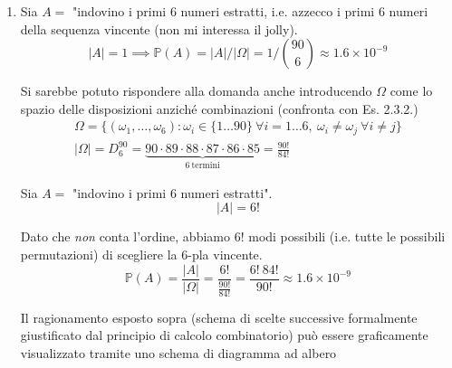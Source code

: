 \begin{enumerate}
\item Sia $A=$ "indovino i primi $6$ numeri estratti, i.e. azzecco i primi $6$ numeri della sequenza vincente (non mi interessa il jolly).\begin{equation*}
| A| =1\implies \mathbb{P}( A) =| A| /| \Omega | =1/\binom{90}{6} \approx 1.6\times 10^{-9}
\end{equation*}

\begin{oss}
Si sarebbe potuto rispondere alla domanda anche introducendo $\Omega $ come lo spazio delle disposizioni anziché combinazioni (confronta con Es. 2.3.2.)\begin{gather*}
\Omega =\{( \omega _{1} ,\dots ,\omega _{6}) :\omega _{i} \in \{1\dots 90\} \ \forall i=1\dots 6,\ \omega _{i} \neq \omega _{j} \ \forall i\neq j\}\\
| \Omega | =D_{6}^{90} =\underbrace{90\cdot 89\cdot 88\cdot 87\cdot 86\cdot 85}_{6\ \text{termini}} =\frac{90!}{84!}
\end{gather*}
\end{oss}

Sia $A=$ "indovino i primi $6$ numeri estratti".\begin{equation*}
| A| =6!
\end{equation*}

Dato che \textit{non} conta l'ordine, abbiamo $6!$ modi possibili (i.e. tutte le possibili permutazioni) di scegliere la $6$-pla vincente.\begin{equation*}
\mathbb{P}( A) =\frac{| A| }{| \Omega | } =\frac{6!}{\frac{90!}{84!}} =\frac{6!\ 84!}{90!} \approx 1.6\times 10^{-9}
\end{equation*}

Il ragionamento esposto sopra (schema di scelte successive formalmente giustificato dal principio di calcolo combinatorio) può essere graficamente visualizzato tramite uno schema di diagramma ad albero


\begin{tikzpicture}[x=0.75pt,y=0.75pt,yscale=-1,xscale=1]


\end{tikzpicture}
\end{enumerate}
